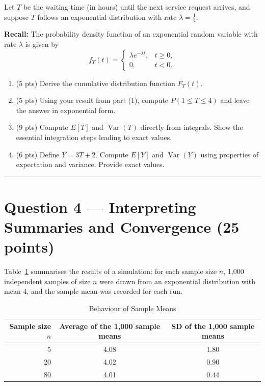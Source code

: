 \documentclass[11pt]{article}
\begin{document}
Let $T$ be the waiting time (in hours) until the next service request arrives, and suppose $T$ follows an exponential distribution with rate $\lambda = \tfrac{1}{4}$.

\medskip
\noindent\textbf{Recall:} The probability density function of an exponential random variable with rate $\lambda$ is given by
\[
f_T(t) =
\begin{cases}
\lambda e^{-\lambda t}, & t \ge 0,\\
0, & t < 0.
\end{cases}
\]

\begin{enumerate}
  \item (5 pts) Derive the cumulative distribution function $F_T(t)$.
  \item (5 pts) Using your result from part (1), compute $P(1 \le T \le 4)$ and leave the answer in exponential form.
  \item (9 pts) Compute $E[T]$ and $\operatorname{Var}(T)$ directly from integrals. Show the essential integration steps leading to exact values.
  \item (6 pts) Define $Y = 3T + 2$. Compute $E[Y]$ and $\operatorname{Var}(Y)$ using properties of expectation and variance. Provide exact values.
\end{enumerate}

\vspace{0.75em}
\hrule
\vspace{0.75em}

\section*{Question 4 — Interpreting Summaries and Convergence (25 points)}

Table~\ref{tab:a-sim-sol} summarises the results of a simulation: for each sample size $n$, 1{,}000 independent samples of size $n$ were drawn from an exponential distribution with mean $4$, and the sample mean was recorded for each run.

\begin{table}[h]
\centering
\caption{Behaviour of Sample Means}\label{tab:a-sim-sol}
\begin{tabular}{@{}rcc@{}}
\toprule
\textbf{Sample size $n$} & \textbf{Average of the 1,000 sample means} & \textbf{SD of the 1,000 sample means}\\
\midrule
5  & 4.08 & 1.80 \\
20 & 4.02 & 0.90 \\
80 & 4.01 & 0.44 \\
\bottomrule
\end{tabular}
\end{table}
\end{document}
